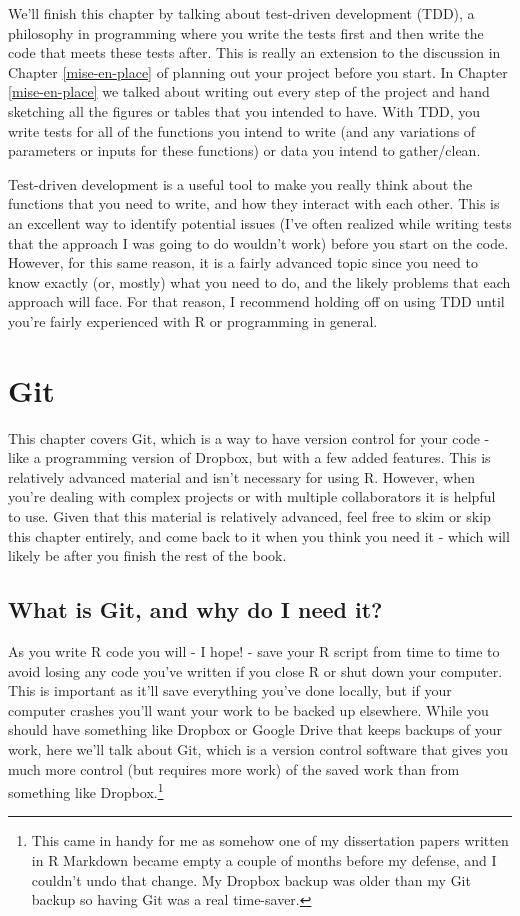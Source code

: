 \documentclass[
  a4paper,
]{krantz}
\begin{document}
We'll finish this chapter by talking about test-driven
development (TDD), a philosophy in programming where you
write the tests first and then write the code that meets
these tests after. This is really an extension to the
discussion in Chapter \ref{mise-en-place} of planning out
your project before you start. In Chapter
\ref{mise-en-place} we talked about writing out every step
of the project and hand sketching all the figures or tables
that you intended to have. With TDD, you write tests for all
of the functions you intend to write (and any variations of
parameters or inputs for these functions) or data you intend
to gather/clean.

Test-driven development is a useful tool to make you really
think about the functions that you need to write, and how
they interact with each other. This is an excellent way to
identify potential issues (I've often realized while writing
tests that the approach I was going to do wouldn't work)
before you start on the code. However, for this same reason,
it is a fairly advanced topic since you need to know exactly
(or, mostly) what you need to do, and the likely problems
that each approach will face. For that reason, I recommend
holding off on using TDD until you're fairly experienced
with R or programming in general.

\hypertarget{git}{%
\chapter{Git}\label{git}}

This chapter covers Git, which is a way to have version
control for your code - like a programming version of
Dropbox, but with a few added features. This is relatively
advanced material and isn't necessary for using R. However,
when you're dealing with complex projects or with multiple
collaborators it is helpful to use. Given that this material
is relatively advanced, feel free to skim or skip this
chapter entirely, and come back to it when you think you
need it - which will likely be after you finish the rest of
the book.

\hypertarget{what-is-git-and-why-do-i-need-it}{%
\section{What is Git, and why do I need
it?}\label{what-is-git-and-why-do-i-need-it}}

As you write R code you will - I hope! - save your R script
from time to time to avoid losing any code you've written if
you close R or shut down your computer. This is important as
it'll save everything you've done locally, but if your
computer crashes you'll want your work to be backed up
elsewhere. While you should have something like Dropbox or
Google Drive that keeps backups of your work, here we'll
talk about Git, which is a version control software that
gives you much more control (but requires more work) of the
saved work than from something like Dropbox.\footnote{This
  came in handy for me as somehow one of my dissertation
  papers written in R Markdown became empty a couple of
  months before my defense, and I couldn't undo that change.
  My Dropbox backup was older than my Git backup so having
  Git was a real time-saver.}
\end{document}
